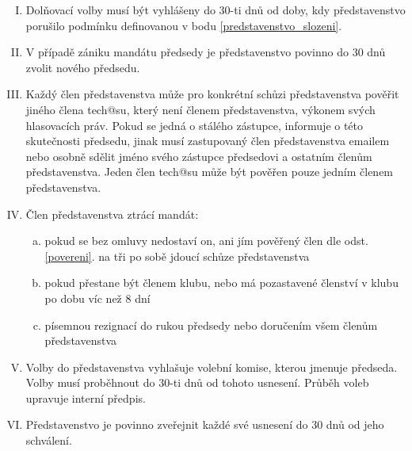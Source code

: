 \documentclass[10pt]{article}
\begin{document}
\begin{enumerate}[I.]
	\item Dolňovací volby musí být vyhlášeny do 30-ti dnů od doby, kdy představenstvo porušilo podmínku definovanou v bodu \ref{predstavenstvo_slozeni}.
	\item V případě zániku mandátu předsedy je představenstvo povinno do 30 dnů zvolit nového předsedu.
	\item \label{povereni} Každý člen představenstva může pro konkrétní schůzi představenstva pověřit jiného člena tech@su, který není členem představenstva, výkonem svých hlasovacích práv. Pokud se jedná o stálého zástupce, informuje o této skutečnosti předsedu, jinak musí zastupovaný člen představenstva emailem nebo osobně sdělit jméno svého zástupce předsedovi a ostatním členům představenstva. Jeden člen tech@su může být pověřen pouze jedním členem představenstva.  
	\item Člen představenstva ztrácí mandát:
		\begin{enumerate}[a.]
		\item pokud se bez omluvy nedostaví on, ani jím pověřený člen dle odst. \ref{povereni}. na tři po sobě jdoucí schůze představenstva
		\item pokud přestane být členem klubu, nebo má pozastavené členství v klubu po dobu víc než 8 dní
		\item písemnou rezignací do rukou předsedy nebo doručením všem členům představenstva
		\end{enumerate}
	\item Volby do představenstva vyhlašuje volební komise, kterou jmenuje předseda. Volby musí proběhnout do 30-ti dnů od tohoto usnesení. Průběh voleb upravuje interní předpis.
	\item Představenstvo je povinno zveřejnit každé své usnesení do 30 dnů od jeho schválení.
	\end{enumerate}
\end{document}
